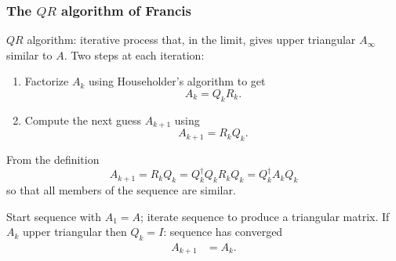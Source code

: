 \documentclass{beamer}
\begin{document}
\begin{frame}
  \frametitle{\texorpdfstring{The $QR$ algorithm of Francis}{The QR
      algorithm of Francis}}

  $QR$ algorithm: iterative process that, in the limit, gives upper
  triangular $A_{\infty}$ similar to $A$. \pause Two steps at each
  iteration:
  \begin{enumerate}
  \item Factorize $A_k$ using Householder's algorithm to get
    \begin{equation*}
      A_k = Q_k R_k.
    \end{equation*}
  \item Compute the next guess $A_{k+1}$ using
    \begin{equation*}
      A_{k+1} = R_k Q_k.
    \end{equation*}
  \end{enumerate} \pause

  From the definition
  \begin{equation*}
    A_{k+1}  = R_k Q_k = Q_k^{\dagger} Q_k R_k Q_k = Q_k^{\dagger} A_k Q_k
  \end{equation*}
  so that all members of the sequence are similar. \pause

  \vspace{1ex}

  Start sequence with $A_1 = A$; iterate sequence to produce a
  triangular matrix.%
  If $A_k$ upper triangular then $Q_k = I$: sequence has converged
  \begin{align*}
    A_{k+1} & = A_k .
  \end{align*}



\end{frame}


\end{document}
